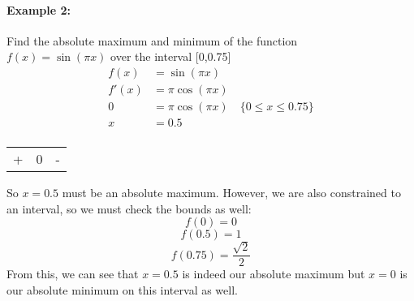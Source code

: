 \documentclass[../revisedmain.tex]{subfiles}
\begin{document}
	\paragraph{Example 2:}Find the absolute maximum and minimum of the function\\\(f(x)=\sin(\pi x)\) over the interval [0,0.75]
	\begin{equation}
		\begin{split}
		f(x)&=\sin(\pi x)\\
		f'(x)&=\pi\cos(\pi x)\\
		0&=\pi\cos(\pi x)\quad \{0\le x\le 0.75\}\\
		x&=0.5\\
		\end{split}
	\end{equation}
	\begin{center}
		\begin{tabular}{|c|c|c|}
		\hline
		[0,0.5)&0.5&(0.5,0.75]\\\hline
		+&0&-\\\hline
	\end{tabular}
	\end{center}\vspace{.25in}
	So $x=0.5$ must be an absolute maximum. However, we are also constrained to an interval, so we must check the bounds as well:\[f(0)=0\]\[f(0.5)=1\]\[f(0.75)=\displaystyle\frac{\sqrt{2}}{2}\]From this, we can see that $x=0.5$ is indeed our absolute maximum but $x=0$ is our absolute minimum on this interval as well.\\\\
\end{document}
